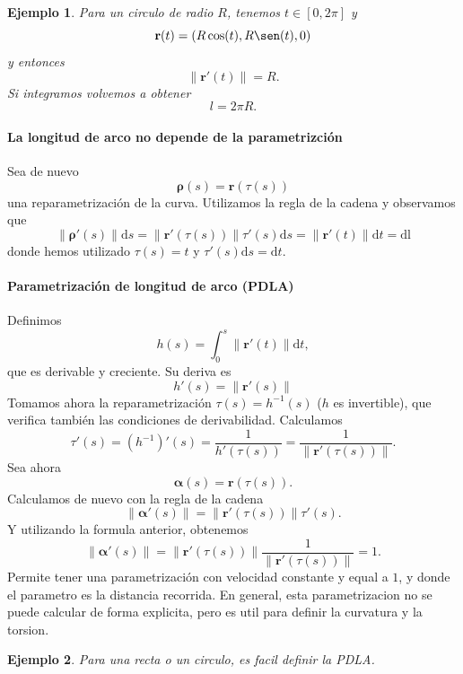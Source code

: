 \documentclass[11pt]{book}
\theoremstyle{definicion}
\theoremstyle{teorema}
\theoremstyle{ejemplo}
\newtheorem{ejemplo}{Ejemplo}[section]
\begin{document}
\begin{ejemplo}
    Para un circulo de radio $R$, tenemos $t\in [0,2\pi]$ y
    \[ \mathbf{r}(t) = ( R \cos(t), R\sen(t) , 0 )\]
    y entonces
    \[
    \| \mathbf{r}'(t) \| = R.
    \]
    Si integramos volvemos a obtener
    \[
    l = 2\pi R.
    \]
\end{ejemplo}

\paragraph{La longitud de arco no depende de la parametrizci\'on}
Sea de nuevo 
$$\boldsymbol{\rho}(s)=\mathbf{r}(\tau(s))$$ una reparametrizaci\'on de la curva.
Utilizamos la regla de la cadena y observamos que
\[
\| \boldsymbol{\rho}'(s)   \| \mathrm{d}s
= 
\| \mathbf{r}'(\tau(s)) \| \tau'(s) \mathrm{d}s
=
\| \mathbf{r}'(t) \| \mathrm{d}t =
\mathrm{dl}
\]
donde hemos utilizado $\tau(s)=t$ y $\tau'(s) \mathrm{d}s = \mathrm{d}t$.

\paragraph{Parametrizaci\'on de longitud de arco (PDLA)} Definimos
$$
h(s) = \int_0^s \| \mathbf{r}'(t) \| \mathrm{d}t,$$ que es derivable y creciente. Su deriva es
\[
h'(s) = \| \mathbf{r}'(s) \|
\]
Tomamos ahora la reparametrizaci\'on $\tau(s)=h^{-1}(s)$ ($h$ es invertible), que verifica tambi\'en las condiciones de derivabilidad. Calculamos
$$\tau'(s)=(h^{-1})'(s)=\frac{1}{h'(\tau(s))}
=
\frac{1}{\| \mathbf{r}'(\tau(s)) \|}.$$
Sea ahora 
$$
\boldsymbol{\alpha}(s) = \mathbf{r} (\tau(s)).$$
%
Calculamos de nuevo con la regla de la cadena
\[
\| \boldsymbol{\alpha}'(s) \|= \| \mathbf{r}'  (\tau(s))\| \tau'(s).
\]
Y utilizando la formula anterior, obtenemos
\[
\| \boldsymbol{\alpha}'(s) \|= \| \mathbf{r}'  (\tau(s))\| \frac{1}{\| \mathbf{r}'(\tau(s)) \|} =1.
\]
Permite tener una parametrizaci\'on con velocidad constante y equal a $1$, y donde el parametro es la distancia recorrida. En general, esta parametrizacion no se puede calcular de forma explicita, pero es util para definir la curvatura y la torsion. 

\begin{ejemplo}
    Para una recta o un circulo, es facil definir la PDLA.
\end{ejemplo}
\end{document}
